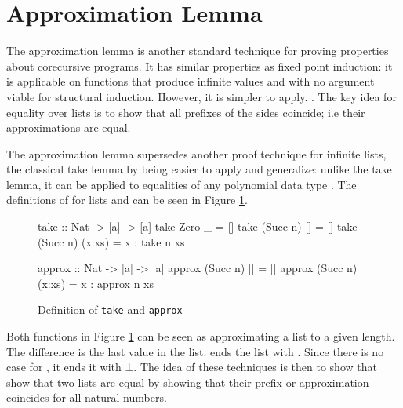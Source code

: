 \section{Approximation Lemma}
\label{sec:approx}

The approximation lemma is another standard technique for proving
properties about corecursive programs. It has similar properties as
fixed point induction: it is applicable on functions that produce
infinite values and with no argument viable for structural induction.
However, it is simpler to apply. \citep{corecursive}. The key idea for
equality over lists is to show that all prefixes of the sides
coincide; i.e their approximations are equal.

The approximation lemma supersedes another proof technique for
infinite lists, the classical take lemma \citep{introfp} by being
easier to apply and generalize: unlike the take lemma, it can be
applied to equalities of any polynomial data type
\citep{genapprox}. The definitions of  for lists and
 can be seen in Figure \ref{code:takeapprox}.

\begin{figure}[h!]
\centering
\begin{minipage}[b]{6.2cm}
\begin{code}
take :: Nat -> [a] -> [a]
take Zero     _      = []
take (Succ n) []     = []
take (Succ n) (x:xs) = x : take n xs
\end{code}
\end{minipage}
\hspace{10pt}
\begin{minipage}[b]{6.7cm}
\begin{code}
approx :: Nat -> [a] -> [a]
approx (Succ n) []     = []
approx (Succ n) (x:xs) = x : approx n xs
\end{code}
\end{minipage}
\caption{Definition of \texttt{take} and \texttt{approx}
\label{code:takeapprox}
}
\end{figure}

Both functions in Figure \ref{code:takeapprox} can be seen as
approximating a list to a given length. The difference is the last
value in the list.  ends the list with \hs{[]}. Since there
is no  case for , it ends it with $\bot$.  The
idea of these techniques is then to show that show that two lists are
equal by showing that their prefix or approximation coincides for all
natural numbers.

